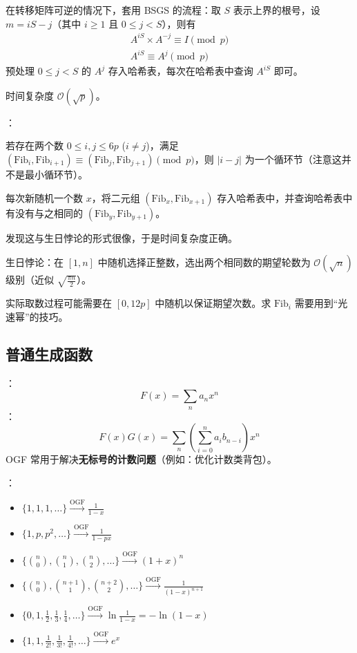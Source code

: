 在转移矩阵可逆的情况下，套用 BSGS 的流程：取 $S$ 表示上界的根号，设 $m = iS - j$（其中 $i \geq 1$ 且 $0 \leq j < S$），则有
\[
\begin{gathered}
A^{iS} \times A^{-j} \equiv I \pmod p \\
A^{iS} \equiv A^j \pmod p
\end{gathered}
\]
预处理 $0 \leq j < S$ 的 $A^j$ 存入哈希表，每次在哈希表中查询 $A^{iS}$ 即可。

时间复杂度 $\mathcal{O}(\sqrt{p})$。

：

若存在两个数 $0 \leq i, j \leq 6p$ ($i \neq j$)，满足 $(\mathrm{Fib}_i, \mathrm{Fib}_{i + 1}) \equiv (\mathrm{Fib}_j, \mathrm{Fib}_{j + 1}) \pmod p$，则 $|i - j|$ 为一个循环节（注意这并不是最小循环节）。

每次新随机一个数 $x$，将二元组 $(\mathrm{Fib}_x, \mathrm{Fib}_{x + 1})$ 存入哈希表中，并查询哈希表中有没有与之相同的 $(\mathrm{Fib}_y, \mathrm{Fib}_{y + 1})$。

发现这与生日悖论的形式很像，于是时间复杂度正确。

\begin{quoteblock}
生日悖论：在 $[1, n]$ 中随机选择正整数，选出两个相同数的期望轮数为 $\mathcal{O}(\sqrt{n})$ 级别（近似 $\sqrt{\frac{\pi n}{2}}$）。
\end{quoteblock}

实际取数过程可能需要在 $[0, 12p]$ 中随机以保证期望次数。求 $\mathrm{Fib}_{i}$ 需要用到“光速幂”的技巧。

\subsection{普通生成函数}

：
\[
F(x) = \sum_{n} a_nx^n
\]
：
\[
F(x)G(x) = \sum_{n} \left( \sum_{i = 0}^n a_ib_{n - i} \right)x^n
\]
OGF 常用于解决\textbf{无标号的计数问题}（例如：优化计数类背包）。

：

\begin{itemize}
    \item $\{1, 1, 1, \dots \} \xrightarrow{\mathrm{OGF}} \frac{1}{1 - x}$
    \item $\{1, p, p^2, \dots \} \xrightarrow{\mathrm{OGF}} \frac{1}{1 - px}$
    \item $\{ \binom{n}{0}, \binom{n}{1}, \binom{n}{2}, \dots \} \xrightarrow{\mathrm{OGF}} (1 + x)^n$
    \item $\{ \binom{n}{0}, \binom{n + 1}{1}, \binom{n + 2}{2}, \dots \} \xrightarrow{\mathrm{OGF}} \frac{1}{(1 - x)^{n + 1}}$
    \item $\{ 0, 1, \frac{1}{2}, \frac{1}{3}, \frac{1}{4}, \dots \} \xrightarrow{\mathrm{OGF}} \ln \frac{1}{1 - x} = -\ln(1 - x)$
    \item $\{ 1, 1, \frac{1}{2!}, \frac{1}{3!}, \frac{1}{4!}, \dots \} \xrightarrow{\mathrm{OGF}} e^x$
\end{itemize}


